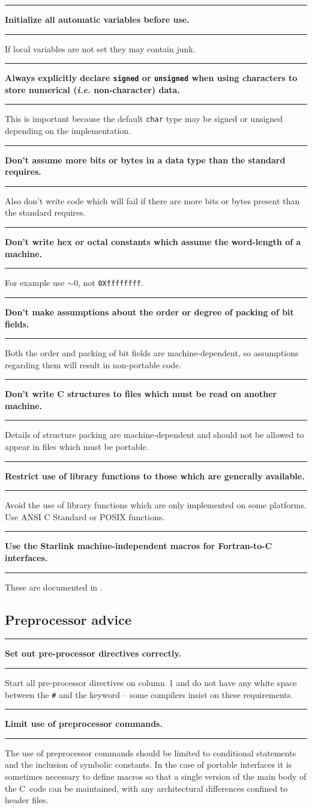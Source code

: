 \documentclass[twoside,11pt,nolof,noabs]{starlink}
\newcounter{sruleno}
\newcommand{\srule}[1]{
    \addtocounter{sruleno}{1}
    \goodbreak
    \rule{\textwidth}{0.3mm}
    \textbf{#1} \scpushright{\textbf{\thesruleno}}
    \rule{\textwidth}{0.1mm}
}
\begin{document}
\srule{Initialize all automatic variables before use.}
If local variables are not set they may contain junk.

\srule{Always explicitly declare \texttt{signed} or \texttt{unsigned} when using
characters to store  numerical ({\sl i.e.} non-character) data.}
This is important because
the default \texttt{char} type may be signed
or unsigned depending on the implementation.


\srule{Don't assume more bits or bytes in a data type than the standard
 requires.}
Also don't write code which will fail if there are more bits or bytes present
than the standard requires.


\srule{Don't write hex or octal constants which assume the word-length of a
machine.}
For example use {\tt$\sim0$}, not \texttt{0Xffffffff}.


\srule{Don't make assumptions about the order or degree of packing of
bit fields.}
Both the order and packing of bit fields are machine-dependent, so
assumptions regarding them will result in non-portable code.

\srule{Don't write C structures to files which must be read on another
machine.}
Details of structure packing are machine-dependent and should not be allowed
to appear in files which must be portable.

\srule{Restrict use of library functions to those which are
generally available.}
Avoid the use of library functions which are only implemented
on some platforms. Use ANSI C Standard or POSIX functions.

\srule{Use the Starlink machine-independent macros for Fortran-to-C
interfaces.}
These are documented in .

\subsection{Preprocessor advice}


\srule{Set out pre-processor directives correctly.}
Start all pre-processor directives on column~1 and do not have any white
space between the \texttt{\#} and the keyword -- some compilers insist on
these requirements.

\srule{Limit use of preprocessor commands.}
The use of preprocessor commands should be limited to conditional
statements and the inclusion of symbolic constants.
In the case of portable interfaces it is sometimes necessary to define
macros so that a single version of the main body of the C~code can be
maintained,
with any architectural differences confined to header files.
\end{document}
